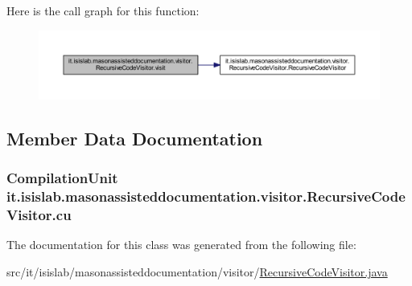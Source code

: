 Here is the call graph for this function\-:
\nopagebreak
\begin{figure}[H]
\begin{center}
\leavevmode
\includegraphics[width=350pt]{classit_1_1isislab_1_1masonassisteddocumentation_1_1visitor_1_1_recursive_code_visitor_ae3a05eadf37fa7680eeb661ed7ca1b8c_cgraph}
\end{center}
\end{figure}




\subsection{Member Data Documentation}
\hypertarget{classit_1_1isislab_1_1masonassisteddocumentation_1_1visitor_1_1_recursive_code_visitor_a1adf4bdd3390549bd3e631365b5033c3}{
\subsubsection[{cu}]{\setlength{\rightskip}{0pt plus 5cm}Compilation\-Unit it.\-isislab.\-masonassisteddocumentation.\-visitor.\-Recursive\-Code\-Visitor.\-cu\hspace{0.3cm}{\ttfamily [private]}}}\label{classit_1_1isislab_1_1masonassisteddocumentation_1_1visitor_1_1_recursive_code_visitor_a1adf4bdd3390549bd3e631365b5033c3}


The documentation for this class was generated from the following file\-:\begin{DoxyCompactItemize}
\item 
src/it/isislab/masonassisteddocumentation/visitor/\hyperlink{_recursive_code_visitor_8java}{Recursive\-Code\-Visitor.\-java}\end{DoxyCompactItemize}
